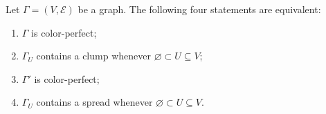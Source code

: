 Let $\Gamma = (V, \mathcal{E})$ be a graph. The following four statements are equivalent:
\begin{enumerate}
\item[(a)] $\Gamma$ is color-perfect;
\item[(b)] $\Gamma_U$ contains a clump whenever $\varnothing \subset U \subseteq V$;
\item[(c)] $\Gamma'$ is color-perfect;
\item[(d)] $\Gamma_U$ contains a spread whenever $\varnothing \subset U \subseteq V$.
\end{enumerate}
